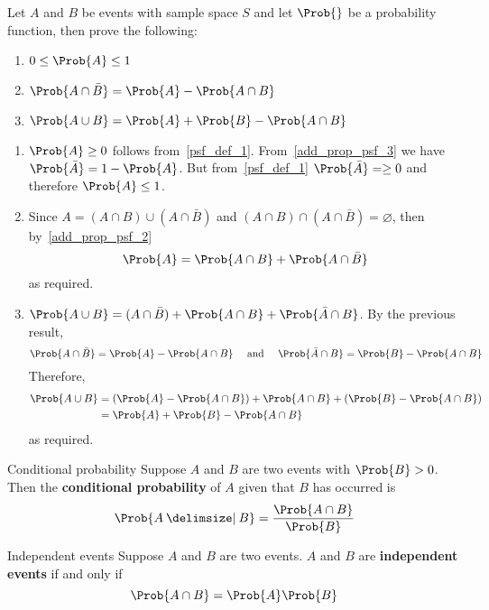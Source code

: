 \begin{Exercise}{}{}
    Let $ A $ and $ B $ be events with sample space $ S $
    and let $ \Prob{} $ be a probability function, then prove the following:
    \begin{enumerate}
        \item $ 0\le \Prob{A}\le 1 $
        \item $ \Prob{A\cap\bar{B}}=\Prob{A}-\Prob{A\cap B} $
        \item $ \Prob{A\cup B}=\Prob{A}+\Prob{B}-\Prob{A\cap B} $
    \end{enumerate}
\end{Exercise}
\begin{enumerate}
    \item $ \Prob{A}\ge 0 $ follows from~\ref{psf_def_1}. From~\ref{add_prop_psf_3}
          we have $ \Prob{\bar{A}}=1-\Prob{A} $. But from~\ref{psf_def_1} $ \Prob{\bar{A}}=\ge 0 $
          and therefore $ \Prob{A}\le 1 $.
    \item Since $ A=(A\cap B)\cup (A\cap \bar{B}) $ and $ (A\cap B)\cap (A\cap \bar{B})
              =\varnothing $, then by~\ref{add_prop_psf_2}
          \[ \Prob{A}=\Prob{A\cap B}+\Prob{A\cap\bar{B}} \]
          as required.
    \item $ \Prob{A\cup B}=(A\cap \bar{B})+\Prob{A\cap B}+\Prob{\bar{A}\cap B} $. By the previous
          result,
          \[ \Prob{A\cap \bar{B}}=\Prob{A}-\Prob{A\cap B}\quad\text{ and }\quad\Prob{\bar{A}\cap B}=\Prob{B}-\Prob{A\cap B}\]
          Therefore,
          \begin{align*}
              \Prob{A\cup B} & =(\Prob{A}-\Prob{A\cap B})+\Prob{A\cap B}+(\Prob{B}-\Prob{A\cap B}) \\
                             & =\Prob{A}+\Prob{B}-\Prob{A\cap B}
          \end{align*}
          as required.
\end{enumerate}

\begin{Definition}{Conditional probability}{}
    Suppose $ A $ and $ B $ are two events with
    $ \Prob{B}>0 $. Then the \textbf{conditional probability}
    of $ A $ given that $ B $ has occurred is
    \[ \Prob{A\given B}=\frac{\Prob{A\cap B}}{\Prob{B}} \]
\end{Definition}

\begin{Definition}{Independent events}{}
    Suppose $ A $ and $ B $ are two events. $ A $ and
    $ B $ are \textbf{independent events} if and only if
    \[ \Prob{A\cap B}=\Prob{A}\Prob{B} \]
\end{Definition}

